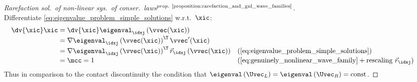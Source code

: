 \begin{proofbox}\nospacing
    \begin{proof}[\newline Rarefaction sol.\ of non-linear sys.\ of conser.\ laws$^{prop.~\text{\ref{proposition:rarefaction_and_gnl_wave_families}}}$]\leavevmode\\
        \label{proof:rarefaction_and_gnl_wave_families}
        Differentiate \cref{eq:eigenvalue_problem_simple_solutions} w.r.t.\ $\xic$:
        \begin{align*}
          \dv{\xic}\xic&=\dv{\xic}\eigenval_{\idxj}\left(\vvec(\xic)\right)\\[-1\jot]
          &=\nabla\eigenval_{\idxj}\left(\vvec(\xic)\right)^{\T}\vvec'(\xic)\\[-1\jot]
          &=\nabla\eigenval_{\idxj}\left(\vvec(\xic)\right)^{\T}\vec{r}_{\idxj}\left(\vvec(\xic)\right)&&(\text{\cref{eq:eigenvalue_problem_simple_solutions}})\\[-1\jot]
          &=\mcc=1&&(\text{\cref{eq:genuinely_nonlinear_wave_family}}+\text{rescaling }\vec{r}_{\idxj})
        \end{align*}
        Thus in comparison to the contact discontinuity  the condition that $\eigenval\left(\Uvec_{L}\right)=\eigenval\left(\Uvec_{R}\right)=\text{const}$.
    \end{proof}
\end{proofbox}
